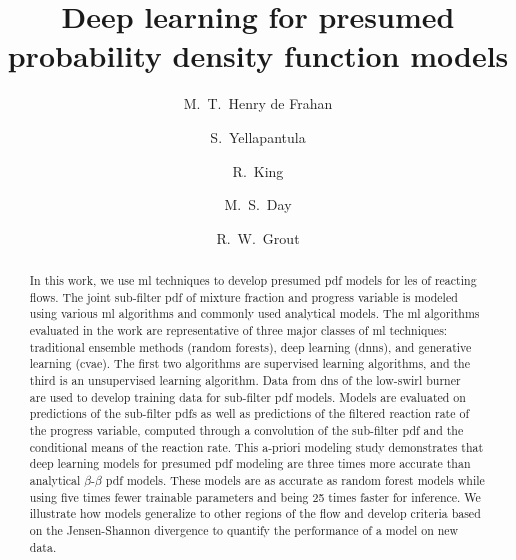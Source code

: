 \documentclass[review]{elsarticle}
\begin{document}
\begin{frontmatter}

\title{Deep learning for presumed probability density function models}

\author[main]{M.~T.~Henry de Frahan}

\author[main]{S.~Yellapantula}

\author[main2]{R.~King}

\author[lbnl]{M.~S.~Day}

\author[main]{R.~W.~Grout}


\address[main]{High Performance Algorithms and Complex Fluids, Computational Science Center, National Renewable Energy Laboratory, 15013 Denver W Pkwy, ESIF301, Golden, CO 80401, USA}
\address[main2]{Complex Systems Simulation and Optimization Group, Computational Science Center, National Renewable Energy Laboratory, 15013 Denver W Pkwy, ESIF301, Golden, CO 80401, USA}
\address[lbnl]{Center for Computational Sciences and Engineering, Lawrence Berkeley National Laboratory, Berkeley, CA 94720, USA}

\begin{abstract}
  In this work, we use \gls{ml} techniques to develop presumed
  \gls{pdf} models for \acrlong{les} of reacting flows. The joint
  sub-filter \gls{pdf} of mixture fraction and progress variable is
  modeled using various \gls{ml} algorithms and commonly used
  analytical models. The \gls{ml} algorithms evaluated in the work are
  representative of three major classes of \gls{ml} techniques:
  traditional ensemble methods (random forests), deep learning
  (\acrlong{dnn}s), and generative learning (\gls{cvae}). The
  first two algorithms are supervised learning algorithms, and the
  third is an unsupervised learning algorithm. Data from \acrlong{dns}
  of the low-swirl burner~\cite{Day2012} are used to develop training
  data for sub-filter \gls{pdf} models. Models are evaluated on
  predictions of the sub-filter \glspl{pdf} as well as predictions of
  the filtered reaction rate of the progress variable, computed
  through a convolution of the sub-filter \gls{pdf} and the
  conditional means of the reaction rate. This a-priori modeling study
  demonstrates that deep learning models for presumed \gls{pdf}
  modeling are three times more accurate than analytical
  $\beta$-$\beta$ \gls{pdf} models. These models are as accurate as
  random forest models while using five times fewer trainable
  parameters and being 25 times faster for inference. We illustrate
  how models generalize to other regions of the flow and develop
  criteria based on the Jensen-Shannon divergence to quantify the
  performance of a model on new data.
\end{abstract}


\end{frontmatter}
\end{document}
